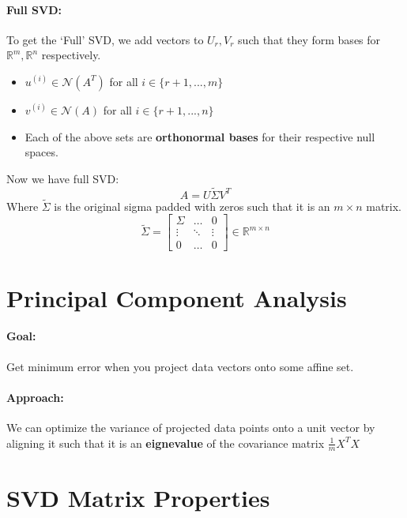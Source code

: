 \documentclass[a4paper,12pt]{report}
\def\reals{\mathbb{R}}
\begin{document}
\paragraph{Full SVD: } To get the `Full' SVD, we add vectors to $U_r, V_r$ such that they form bases for $\reals^m, \reals^n$ respectively.

\begin{itemize}
\item $u^{(i)} \in \mathcal{N}(A^T)$ for all $i \in \{r+1, ..., m\}$
\item $v^{(i)} \in \mathcal{N}(A)$ for all $i\in \{r+1, ..., n\}$
\item Each of the above sets are \textbf{orthonormal bases} for their respective null spaces.
\end{itemize}

Now we have full SVD: 
\begin{equation}
A = U\tilde{\Sigma}V^T
\end{equation}
Where $\tilde{\Sigma}$ is the original sigma padded with zeros such that it is an $m \times n$ matrix.
\begin{equation}
\tilde{\Sigma} = 
\begin{bmatrix}
\Sigma & \dots & 0 \\
\vdots & \ddots & \vdots \\
0 & \dots & 0
\end{bmatrix}
\in \reals^{m\times n}
\end{equation}

\section{Principal Component Analysis}

\paragraph{Goal: } Get minimum error when you project data vectors onto some affine set.
\paragraph{Approach: } We can optimize the variance of projected data points onto a unit vector by aligning it such that it is an \textbf{eignevalue} of the covariance matrix $\frac{1}{m} X^TX$



\section{SVD Matrix Properties}
\end{document}
